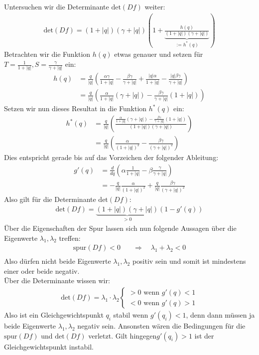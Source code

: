 \documentclass[a4paper,twoside]{article}
\begin{document}
	Untersuchen wir die Determinante \(\textrm{det}(Df)\) weiter:
	\begin{align*}
		\textrm{det}(Df) = (1 + |q|)(\gamma + |q|)\left( 1 + \underbrace{\frac{h(q)}{(1 + |q|)(\gamma + |q|)}}_{:=h^*(q)} \right)
	\end{align*}
	Betrachten wir die Funktion \(h(q)\) etwas genauer und setzen für \(T = \frac{1}{1+|q|}, S = \frac{\gamma}{\gamma + |q|}\) ein:
	\begin{align*}
		h(q) &= \frac{q}{|q|}\left(
			\frac{\alpha \gamma}{1 + |q|} - \frac{\beta \gamma}{\gamma + |q|} + 
			\frac{|q| \alpha}{1+|q|} - \frac{|q| \beta\gamma}{\gamma + |q|}
		\right) \\
		&=\frac{q}{|q|}\left(
			\frac{\alpha}{1 + |q|}(\gamma + |q|) -
			 \frac{\beta \gamma}{\gamma + |q|}(1+|q|)
		\right)
	\end{align*}
	Setzen wir nun dieses Resultat in die Funktion \(h^*(q)\) ein:
	\begin{align*}
		h^*(q) &= \frac{q}{|q|}\left(
			\frac{\frac{\alpha}{1 + |q|}(\gamma + |q|) -
			 \frac{\beta \gamma}{\gamma + |q|}(1+|q|)}
			{(1 + |q|)(\gamma + |q|)}
		\right) \\
		&= \frac{q}{|q|} \left(
			\frac{\alpha}{(1+|q|)^2} - \frac{\beta \gamma}{(\gamma + |q|)^2}
		\right)
	\end{align*}
	Dies entspricht gerade bis auf das Vorzeichen der folgender Ableitung:
	\begin{align*}
		g'(q) &= \frac{d}{dq} \left(\alpha\frac{1}{1+|q|} - \beta\frac{\gamma}{\gamma+|q|}\right) \\
		&= -\frac{q}{|q|} \frac{\alpha}{(1+|q|)^2} + \frac{q}{|q|} \frac{\beta \gamma}{(\gamma + |q|)^2}
	\end{align*}
	Also gilt für die Determinante \(\textrm{det}(Df)\):
	\begin{align*}
		\textrm{det}(Df) = \underbrace{(1+|q|)(\gamma+|q|)}_{> 0}(1-g'(q))
	\end{align*}
	Über die Eigenschaften der Spur lassen sich nun folgende Aussagen über die Eigenwerte \(\lambda_1, \lambda_2\) treffen:
	\begin{align*}
		\textrm{spur}(Df) < 0 \quad &\Rightarrow \quad  \lambda_1 + \lambda_2 < 0 \\
	\end{align*}
	Also dürfen nicht beide Eigenwerte \(\lambda_1, \lambda_2\) positiv sein und somit ist mindestens einer oder beide negativ. \\
	Über die Determinante wissen wir:
	\begin{align*}
		\textrm{det}(Df) = \lambda_1 \cdot \lambda_2 \left\{ \begin{array}{l}
			> 0 \textrm{ wenn } g'(q) < 1 \\
			< 0 \textrm{ wenn } g'(q) > 1
		\end{array} \right.
	\end{align*}
	Also ist ein Gleichgewichtspunkt \(q_i\) stabil wenn \(g'(q_i) < 1\), denn dann müssen ja beide Eigenwerte \(\lambda_1, \lambda_2\) negativ sein. Ansonsten wären die Bedingungen für die \(\textrm{spur}(Df)\) und \(\textrm{det}(Df)\) verletzt. Gilt hingegen\(g'(q_i) > 1\) ist der Gleichgewichtspunkt instabil.
	
\end{document}
